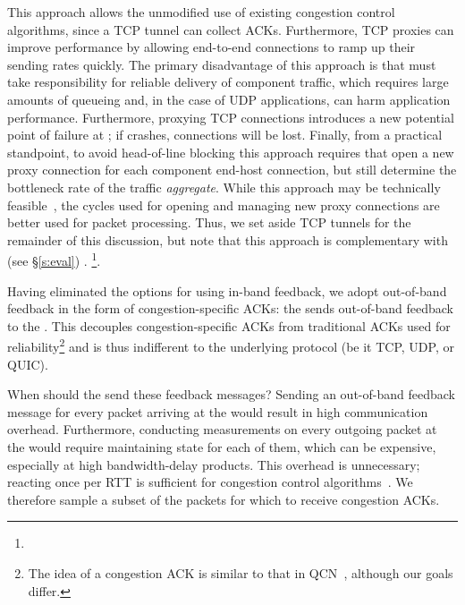  This approach allows the unmodified use of existing congestion control algorithms, since a TCP tunnel can collect ACKs. Furthermore, TCP proxies can improve performance by allowing end-to-end connections to ramp up their sending rates quickly.
The primary disadvantage of this approach is that \name must take responsibility for reliable delivery of component traffic, which requires large amounts of queueing and, in the case of UDP applications, can harm application performance. 
Furthermore, proxying TCP connections introduces a new potential point of failure at \name; if \name crashes, connections will be lost.
Finally, from a practical standpoint, to avoid head-of-line blocking this approach requires that \name open a new proxy connection for each component end-host connection, but still determine the bottleneck rate of the traffic \emph{aggregate}. While this approach may be technically feasible~\cite{cm}, the cycles used for opening and managing new proxy connections are better used for packet processing.
Thus, we set aside TCP tunnels for the remainder of this discussion, but note that this approach is complementary with \name (see \S\ref{s:eval}) .
\footnote{}.


 Having eliminated the options for using in-band feedback, we adopt out-of-band feedback in the form of congestion-specific ACKs: the \outbox sends out-of-band feedback to the \inbox.
This decouples congestion-specific ACKs from traditional ACKs used for reliability\footnote{The idea of a congestion ACK is similar to that in QCN~\cite{qcn}, although our goals differ.} and is thus indifferent to the underlying protocol (be it TCP, UDP, or QUIC).

When should the \outbox send these feedback messages? 
Sending an out-of-band feedback message for every packet arriving at the \outbox would result in high communication overhead. 
Furthermore, conducting measurements on every outgoing packet at the \inbox would require maintaining state for each of them, which can be expensive, especially at high bandwidth-delay products. 
This overhead is unnecessary; reacting once per RTT is sufficient for congestion control algorithms~\cite{ccp}. 
We therefore sample a subset of the packets for which to receive congestion ACKs.

